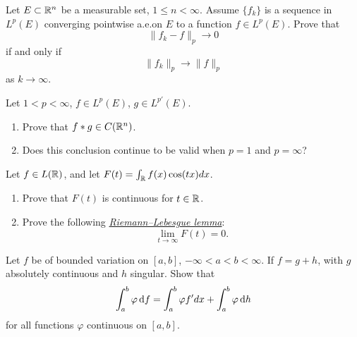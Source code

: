 \begin{problem}
Let $E\subset\mathbb{R}^n$ be a measurable set, $1\leq n<\infty$. Assume
$\{f_k\}$ is a sequence in $L^p(E)$ converging pointwise a.e.\@ on $E$ to a
function $f\in L^p(E)$. Prove that
\[
\|{f_k-f}\|_p\longrightarrow 0
\]
if and only if
\[
\|{f_k}\|_p\longrightarrow\|f\|_p
\]
as $k\to\infty$.
\end{problem}
\begin{solution}
\end{solution}

\begin{problem}
Let $1<p<\infty$, $f\in L^p(E)$, $g\in L^{p'}(E)$.
\begin{enumerate}[label=(\alph*),noitemsep]
\item Prove that $f*g\in C(\mathbb{R}^n)$.
\item Does this conclusion continue to be valid when $p=1$ and $p=\infty$?
\end{enumerate}
\end{problem}
\begin{solution}
\end{solution}

\begin{problem}
Let $f\in L(\mathbb{R})$, and let $F(t)=\int_{\mathbb{R}}f(x)\cos(tx)dx$.
\begin{enumerate}[label=(\alph*),noitemsep]
\item Prove that $F(t)$ is continuous for $t\in\mathbb{R}$.
\item Prove the following
  \href{https://en.wikipedia.org/wiki/Riemann–Lebesgue_lemma}{\emph{Riemann--Lebesgue
      lemma}}:
\[
\lim_{t\to\infty}F(t)=0.
\]
\end{enumerate}
\end{problem}
\begin{solution}
\end{solution}

\begin{problem}
Let $f$ be of bounded variation on $[a,b]$, $-\infty<a<b<\infty$. If
$f=g+h$, with $g$ absolutely continuous and $h$ singular. Show that
\[
\int_a^b\varphi \mathop{}\!\mathrm{d} f=\int_a^b\varphi f'dx+\int_a^b\varphi \mathop{}\!\mathrm{d} h
\]
for all functions $\varphi$ continuous on $[a,b]$.
\end{problem}
\begin{solution}
\end{solution}

